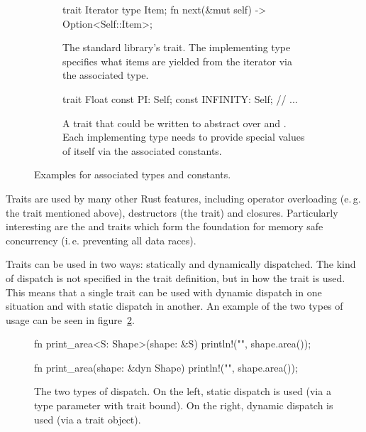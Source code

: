 \begin{figure}[b]
  \centering
    \begin{subfigure}[t]{.47\textwidth}
    \begin{rustcode}
      trait Iterator {
          type Item;
          fn next(&mut self)
              -> Option<Self::Item>;
      }
    \end{rustcode}
    \caption{
      The standard library's  trait.
      The implementing type specifies what items are yielded from the iterator via the associated type.
    }
  \end{subfigure}
  \hspace{.04\textwidth}
  \begin{subfigure}[t]{.47\textwidth}
    \begin{rustcode}
      trait Float {
          const PI: Self;
          const INFINITY: Self;
          // ...
      }
    \end{rustcode}
    \caption{
      A trait that could be written to abstract over  and .
      Each implementing type needs to provide special values of itself via the associated constants.
    }
  \end{subfigure}
  \caption{
    Examples for associated types and constants.
  }
  \label{fig:associated-type-const}
\end{figure}



Traits are used by many other Rust features, including operator overloading (e.\,g. the  trait mentioned above), destructors (the  trait) and closures.
Particularly interesting are the  and  traits which form the foundation for memory safe concurrency (i.\,e. preventing all data races).

Traits can be used in two ways: statically and dynamically dispatched.
The kind of dispatch is not specified in the trait definition, but in how the trait is used.
This means that a single trait can be used with dynamic dispatch in one situation and with static dispatch in another.
An example of the two types of usage can be seen in figure~\ref{fig:dispatch}.

\newpage
\begin{figure}[t]
  \centering
    \begin{minipage}[t]{.49\textwidth}
    \begin{rustcode}
      fn print_area<S: Shape>(shape: &S) {
          println!("{}", shape.area());
      }
    \end{rustcode}
  \end{minipage}
  \begin{minipage}[t]{.49\textwidth}
    \begin{rustcode}
      fn print_area(shape: &dyn Shape) {
          println!("{}", shape.area());
      }
    \end{rustcode}
  \end{minipage}
  \caption{
    The two types of dispatch.
    On the left, static dispatch is used (via a type parameter with trait bound).
    On the right, dynamic dispatch is used (via a trait object).
  }
  \label{fig:dispatch}
\end{figure}

